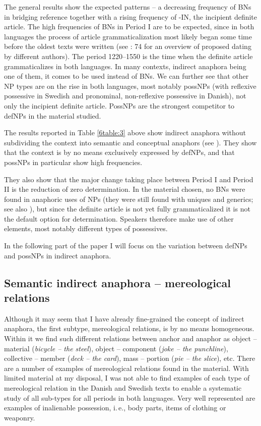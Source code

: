 \documentclass[output=paper]{langsci/langscibook}
\begin{document}
The general results show the expected patterns -- a decreasing frequency of BNs in bridging reference together with a rising frequency of -IN, the incipient definite article. The high frequencies of BNs in Period I are to be expected, since in both languages the process of article grammaticalization most likely began some time before the oldest texts were written (see \citealt{skrzypek:12}: 74 for an overview of proposed dating by different authors). The period 1220--1550 is the time when the definite article grammaticalizes in both languages. In many contexts, indirect anaphora being one of them, it comes to be used instead of BNs. We can further see that other NP types are on the rise in both languages, most notably possNPs (with reflexive possessive in Swedish and pronominal, non-reflexive possessive in Danish), not only the incipient definite article. PossNPs are the strongest competitor to defNPs in the material studied. 

The results reported in Table \ref{6table:3} above show indirect anaphora without subdividing the context into semantic and conceptual anaphors (see ). They show that the context is by no means exclusively expressed by defNPs, and that possNPs in particular show high frequencies.

They also show that the major change taking place between Period I and Period II is the reduction of zero determination. In the material chosen, no BNs were found in anaphoric uses of NPs (they were still found with uniques and generics; see also \citealt{skrzypek:12}), but since the definite article is not yet fully grammaticalized it is not the default option for determination. Speakers therefore make use of other elements, most notably different types of possessives. 

In the following part of the paper I will focus on the variation between defNPs and possNPs in indirect anaphora.


\subsection{Semantic indirect anaphora -- mereological relations}\label{6sec:41}

Although it may seem that I have already fine-grained the concept of indirect anaphora, the first subtype, mereological relations, is by no means homogeneous. Within it we find such different relations between anchor and anaphor as object -- material ({\emph{bicycle -- the steel}}), object -- component ({\emph{joke -- the punchline}}), collective -- member ({\emph{deck -- the card}}), mass -- portion ({\emph{pie -- the slice}}), etc. There are a number of examples of mereological relations found in the material. With limited material at my disposal, I was not able to find examples of each type of mereological relation in the Danish and Swedish texts to enable a systematic study of all sub-types for all periods in both languages. Very well represented are examples of inalienable possession, i.\,e., body parts, items of clothing or weaponry. 
\end{document}
